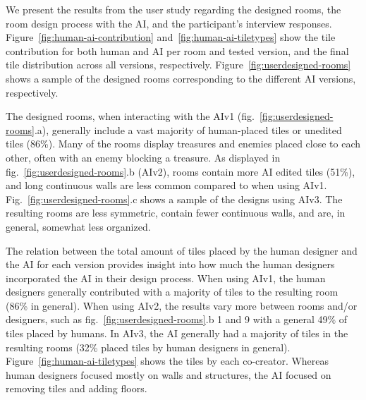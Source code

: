 
We present the results from the user study regarding the designed rooms, the room design process with the AI, and the participant's interview responses. Figure~\ref{fig:human-ai-contribution} and~\ref{fig:human-ai-tiletypes} show the tile contribution for both human and AI per room and tested version, and the final tile distribution across all versions, respectively. Figure~\ref{fig:userdesigned-rooms} shows a sample of the designed rooms corresponding to the different AI versions, respectively. 

The designed rooms, when interacting with the AIv1 (fig.~\ref{fig:userdesigned-rooms}.a), generally include a vast majority of human-placed tiles or unedited tiles (86\%). Many of the rooms display treasures and enemies placed close to each other, often with an enemy blocking a treasure. As displayed in fig.~\ref{fig:userdesigned-rooms}.b (AIv2), rooms contain more AI edited tiles (51\%), and long continuous walls are less common compared to when using AIv1. Fig.~\ref{fig:userdesigned-rooms}.c shows a sample of the designs using AIv3. The resulting rooms are less symmetric, contain fewer continuous walls, and are, in general, somewhat less organized. 

The relation between the total amount of tiles placed by the human designer and the AI for each version provides insight into how much the human designers incorporated the AI in their design process. When using AIv1, the human designers generally contributed with a majority of tiles to the resulting room (86\% in general). When using AIv2, the results vary more between rooms and/or designers, such as fig.~\ref{fig:userdesigned-rooms}.b 1 and 9 with a general 49\% of tiles placed by humans. In AIv3, the AI generally had a majority of tiles in the resulting rooms (32\% placed tiles by human designers in general). Figure~\ref{fig:human-ai-tiletypes} shows the tiles by each co-creator. Whereas human designers focused mostly on walls and structures, the AI focused on removing tiles and adding floors. 


